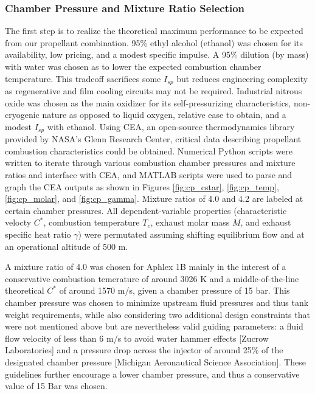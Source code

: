 \documentclass[9pt]{article} %
\numberwithin{equation}{section} %
\begin{document}
\subsubsection{Chamber Pressure and Mixture Ratio Selection}
\hspace{\parindent} The first step is to realize the theoretical maximum performance to be expected from our propellant combination.  95\% ethyl alcohol (ethanol) was chosen for its availability, low pricing, and a modest specific impulse. A 95\% dilution (by mass) with water was chosen as to lower the expected combustion chamber temperature. This tradeoff sacrifices some $I_{sp}$ but reduces engineering complexity as regenerative and film cooling circuits may not be required. Industrial nitrous oxide was chosen as the main oxidizer for its self-pressurizing characteristics, non-cryogenic nature as opposed to liquid oxygen, relative ease to obtain, and a modest $I_{sp}$ with ethanol.
Using CEA, an open-source thermodynamics library provided by NASA's Glenn Research Center, critical data describing propellant combustion characteristics could be obtained. Numerical Python scripts were written to iterate through various combustion chamber pressures and mixture ratios and interface with CEA, and MATLAB scripts were used to parse and graph the CEA outputs as shown in Figures \ref{fig:cp_cstar}, \ref{fig:cp_temp}, \ref{fig:cp_molar}, and \ref{fig:cp_gamma}. Mixture ratios of 4.0 and 4.2 are labeled at certain chamber pressures. All dependent-variable properties (characteristic velocty $C^{*}$, combustion temperature $T_{c}$, exhaust molar mass $M$, and exhaust specific heat ratio $\gamma$) were permutated assuming shifting equilibrium flow and at an operational altitude of 500 m. 

A mixture ratio of 4.0 was chosen for Aphlex 1B mainly in the interest of a conservative combustion temerature of around 3026 K and a middle-of-the-line theoretical $C^{*}$ of around 1570 m/s, given a chamber pressure of 15 bar. This chamber pressure was chosen to minimize upstream fluid pressures and thus tank weight requirements, while also considering two additional design constraints that were not mentioned above but are nevertheless valid guiding parameters: a fluid flow velocity of less than 6 m/s to avoid water hammer effects [Zucrow Laboratories] and a pressure drop across the injector of around 25\% of the designated chamber pressure [Michigan Aeronautical Science Association]. These guidelines further encourage a lower chamber pressure, and thus a conservative value of 15 Bar was chosen.
\end{document}
